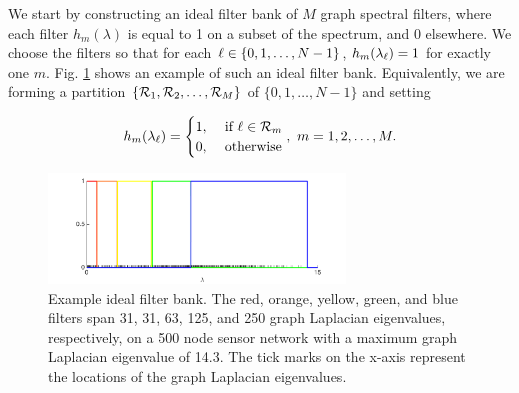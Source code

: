 \documentclass[journal, 10pt]{IEEEtran}
\begin{document}
We start by constructing an ideal filter bank of $M$ graph spectral filters, where each filter ${h}_m(\lambda)$ is equal to 1 on a subset of the spectrum, and 0 elsewhere. We choose the filters so that for each $\ell \in \{0,1,\ldots,N-1\}$, ${h}_m(\lambda_\ell)=1$ for exactly one $m$. Fig. \ref{Fig:fb} shows an example of such an ideal filter bank. 
Equivalently, we are forming a partition $\{{\cal R}_1,{\cal R}_2,\ldots,{\cal R}_M\}$ of $\{0,1,\ldots,N-1\}$ and setting

\begin{align*}
{h}_m(\lambda_{\l})=
\begin{cases}
1,&\hbox{ if } {\l} \in {\cal R}_m \\
0,&\hbox{ otherwise}
\end{cases},~m=1,2,\ldots,M.
\end{align*}

\begin{figure}[t]
\centerline{\includegraphics[width=3.1in]{fig_filter_bank}}
\caption{Example ideal filter bank. The red, orange, yellow, green, and blue filters span 31, 31, 63, 125, and 250 graph Laplacian eigenvalues, respectively, on a 500 node sensor network with %
a maximum graph Laplacian eigenvalue of 14.3. The tick marks on the x-axis represent the locations of the graph Laplacian eigenvalues.}\label{Fig:fb}
\end{figure}
\end{document}
